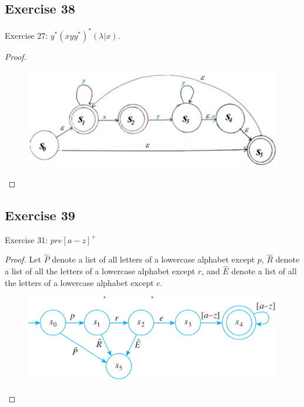 \documentclass[14pt]{extarticle}
\begin{document}
\subsection{Exercise 38}
Exercise 27: \(y^*(xyy^*)^*(\lambda | x)\).
\begin{proof}
    \begin{figure}[ht!]
        \centering
        \includegraphics[scale=0.3]{../images/12.2.38.png}
    \end{figure}
\end{proof}

\subsection{Exercise 39}
Exercise 31:  \(pre[a - z]^+\)
\begin{proof}
    Let \(\hat{P}\) denote a list of all letters of a lowercase alphabet except \(p\), \(\hat{R}\) denote a list of all the
    letters of a lowercase alphabet except \(r\), and \(\hat{E}\) denote a list of all the letters of a lowercase alphabet
    except \(e\).

    \begin{figure}[ht!]
        \centering
        \includegraphics[scale=0.5]{../images/12.2.39.png}
    \end{figure}
\end{proof}
\end{document}
